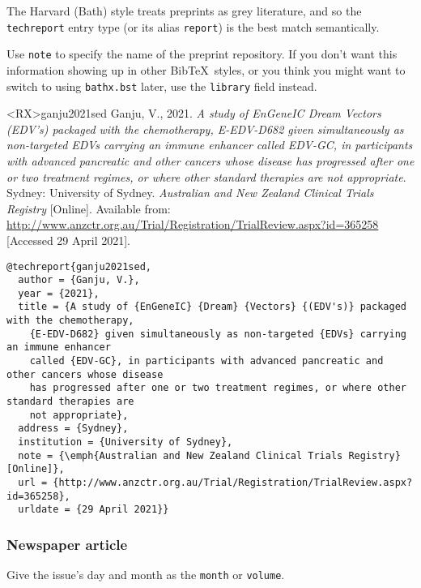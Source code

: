 \documentclass[10pt,a4paper]{article}
\newenvironment{tips}{%
  \begin{list}{\makebox[2em][c]{\faLightbulbO}}{%
    \setlength{\leftmargin}{2em}
    \setlength{\labelwidth}{2em}
    \setlength{\labelsep}{0pt}}
}{\end{list}}
\newenvironment{hacks}{%
  \begin{list}{\makebox[2em][c]{\faWrench}}{%
    \setlength{\leftmargin}{2em}
    \setlength{\labelwidth}{2em}
    \setlength{\labelsep}{0pt}}
}{\end{list}}
\begin{document}
\begin{tips}\item
The Harvard (Bath) style treats preprints as grey literature, and so the
\texttt{techreport} entry type (or its alias \texttt{report}) is the best match
semantically.
\item
Use \texttt{note} to specify the name of the preprint repository.
If you don't want this information showing up in other Bib\TeX\ styles,
or you think you might want to switch to using \texttt{bathx.bst} later,
use the \texttt{library} field instead.
\end{tips}

\begin{bibexbox}<RX>{ganju2021sed}
  Ganju, V., 2021. \emph{A study of EnGeneIC Dream Vectors (EDV's) packaged with the chemotherapy, E-EDV-D682 given simultaneously as non-targeted EDVs carrying an immune enhancer called EDV-GC, in participants with advanced pancreatic and other cancers whose disease has progressed after one or two treatment regimes, or where other standard therapies are not appropriate}. Sydney: University of Sydney. \emph{Australian and New Zealand Clinical Trials Registry} [Online]. Available from: \url{http://www.anzctr.org.au/Trial/Registration/TrialReview.aspx?id=365258} [Accessed 29 April 2021].
  \tcblower
\begin{Verbatim}
@techreport{ganju2021sed,
  author = {Ganju, V.},
  year = {2021},
  title = {A study of {EnGeneIC} {Dream} {Vectors} {(EDV's)} packaged with the chemotherapy,
    {E-EDV-D682} given simultaneously as non-targeted {EDVs} carrying an immune enhancer
    called {EDV-GC}, in participants with advanced pancreatic and other cancers whose disease
    has progressed after one or two treatment regimes, or where other standard therapies are
    not appropriate},
  address = {Sydney},
  institution = {University of Sydney},
  note = {\emph{Australian and New Zealand Clinical Trials Registry} [Online]},
  url = {http://www.anzctr.org.au/Trial/Registration/TrialReview.aspx?id=365258},
  urldate = {29 April 2021}}
\end{Verbatim}
\end{bibexbox}

\subsubsection*{Newspaper article}

\begin{hacks}\item
Give the issue's day and month as the \texttt{month} or \texttt{volume}.
\end{hacks}
\end{document}
